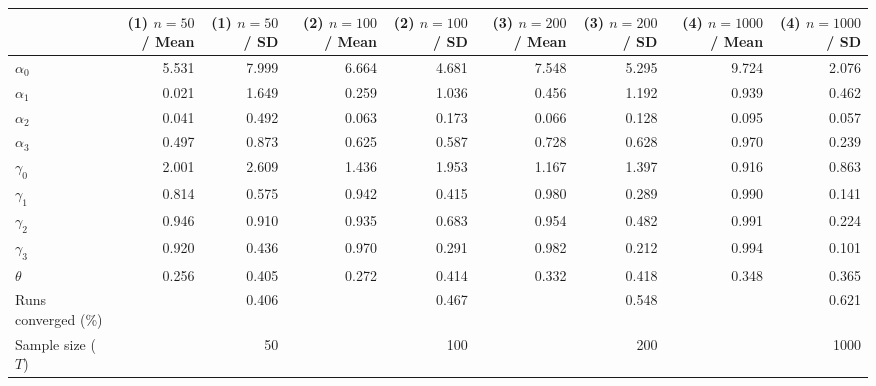 
\begin{tabular}[t]{lrrrrrrrr}
\toprule
  & (1) $n=50$ / Mean & (1) $n=50$ / SD & (2) $n=100$ / Mean & (2) $n=100$ / SD & (3) $n=200$ / Mean & (3) $n=200$ / SD & (4) $n=1000$ / Mean & (4) $n=1000$ / SD\\
\midrule
$\alpha_{0}$ & 5.531 & 7.999 & 6.664 & 4.681 & 7.548 & 5.295 & 9.724 & 2.076\\
$\alpha_{1}$ & 0.021 & 1.649 & 0.259 & 1.036 & 0.456 & 1.192 & 0.939 & 0.462\\
$\alpha_{2}$ & 0.041 & 0.492 & 0.063 & 0.173 & 0.066 & 0.128 & 0.095 & 0.057\\
$\alpha_{3}$ & 0.497 & 0.873 & 0.625 & 0.587 & 0.728 & 0.628 & 0.970 & 0.239\\
$\gamma_{0}$ & 2.001 & 2.609 & 1.436 & 1.953 & 1.167 & 1.397 & 0.916 & 0.863\\
$\gamma_{1}$ & 0.814 & 0.575 & 0.942 & 0.415 & 0.980 & 0.289 & 0.990 & 0.141\\
$\gamma_{2}$ & 0.946 & 0.910 & 0.935 & 0.683 & 0.954 & 0.482 & 0.991 & 0.224\\
$\gamma_{3}$ & 0.920 & 0.436 & 0.970 & 0.291 & 0.982 & 0.212 & 0.994 & 0.101\\
$\theta$ & 0.256 & 0.405 & 0.272 & 0.414 & 0.332 & 0.418 & 0.348 & 0.365\\
Runs converged (\%) &  & 0.406 &  & 0.467 &  & 0.548 &  & 0.621\\
Sample size ($T$) &  & 50 &  & 100 &  & 200 &  & 1000\\
\bottomrule
\end{tabular}
